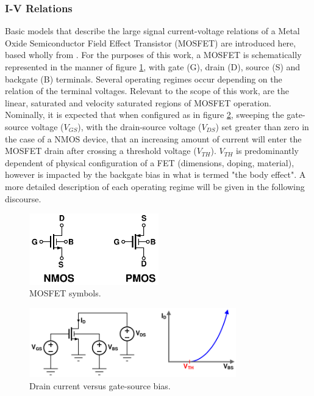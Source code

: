 	\subsubsection{I-V Relations}\label{sec:mos_iv}
	Basic models that describe the large signal current-voltage relations of a Metal Oxide Semiconductor Field Effect Transistor (MOSFET) are introduced here, based wholly from \cite{razavi_2017}. For the purposes of this work, a MOSFET is schematically represented in the manner of figure \ref{fig:mos_symbols}, with gate (G), drain (D), source (S) and backgate (B) terminals. Several operating regimes occur depending on the relation of the terminal voltages. Relevant to the scope of this work, are the linear, saturated and velocity saturated regions of MOSFET operation. Nominally, it is expected that when configured as in figure \ref{fig:vgs_sweep}, sweeping the gate-source voltage ($V_{GS}$), with the drain-source voltage ($V_{DS}$) set greater than zero in the case of a NMOS device, that an increasing amount of current will enter the MOSFET drain after crossing a threshold voltage ($V_{TH}$). $V_{TH}$ is predominantly dependent of physical configuration of a FET (dimensions, doping, material), however is impacted by the backgate bias in what is termed "the body effect". A more detailed description of each operating regime will be given in the following discourse.

			\begin{figure}[htb!]
			        \centering
			        \includegraphics[width=0.5\textwidth, angle=0]{./figs/theory/fet_symbols}
			    \caption{MOSFET symbols.}
			    \label{fig:mos_symbols}
			\end{figure}

			\begin{figure}[htb!]
			        \centering
			        \includegraphics[width=0.8\textwidth, angle=0]{./figs/theory/vgs_sweep}
			    \caption{Drain current versus gate-source bias.}
			    \label{fig:vgs_sweep}
			\end{figure}


